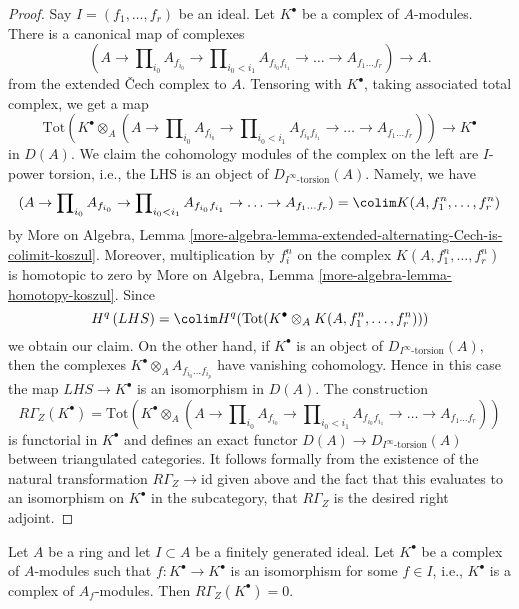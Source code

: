\begin{proof}
Say $I = (f_1, \ldots, f_r)$ be an ideal.
Let $K^\bullet$ be a complex of $A$-modules.
There is a canonical map of complexes
$$
(A \to \prod\nolimits_{i_0} A_{f_{i_0}} \to
\prod\nolimits_{i_0 < i_1} A_{f_{i_0}f_{i_1}} \to
\ldots \to A_{f_1\ldots f_r}) \longrightarrow A.
$$
from the extended {\v C}ech complex to $A$.
Tensoring with $K^\bullet$, taking associated total complex,
we get a map
$$
\text{Tot}\left(
K^\bullet \otimes_A
(A \to \prod\nolimits_{i_0} A_{f_{i_0}} \to
\prod\nolimits_{i_0 < i_1} A_{f_{i_0}f_{i_1}} \to
\ldots \to A_{f_1\ldots f_r})\right)
\longrightarrow
K^\bullet
$$
in $D(A)$. We claim the cohomology modules of the complex on the left are
$I$-power torsion, i.e., the LHS is an object of
$D_{I^\infty\text{-torsion}}(A)$. Namely, we have
$$
(A \to \prod\nolimits_{i_0} A_{f_{i_0}} \to
\prod\nolimits_{i_0 < i_1} A_{f_{i_0}f_{i_1}} \to
\ldots \to A_{f_1\ldots f_r}) = \colim K(A, f_1^n, \ldots, f_r^n)
$$
by More on Algebra, Lemma
\ref{more-algebra-lemma-extended-alternating-Cech-is-colimit-koszul}.
Moreover, multiplication by $f_i^n$ on the complex
$K(A, f_1^n, \ldots, f_r^n)$ is homotopic to zero by
More on Algebra, Lemma \ref{more-algebra-lemma-homotopy-koszul}.
Since
$$
H^q\left( LHS \right) =
\colim H^q(\text{Tot}(K^\bullet \otimes_A K(A, f_1^n, \ldots, f_r^n)))
$$
we obtain our claim. On the other hand, if $K^\bullet$ is an
object of $D_{I^\infty\text{-torsion}}(A)$, then the complexes
$K^\bullet \otimes_A A_{f_{i_0} \ldots f_{i_p}}$ have vanishing
cohomology. Hence in this case the map $LHS \to K^\bullet$
is an isomorphism in $D(A)$. The construction
$$
R\Gamma_Z(K^\bullet) =
\text{Tot}\left(
K^\bullet \otimes_A
(A \to \prod\nolimits_{i_0} A_{f_{i_0}} \to
\prod\nolimits_{i_0 < i_1} A_{f_{i_0}f_{i_1}} \to
\ldots \to A_{f_1\ldots f_r})\right)
$$
is functorial in $K^\bullet$ and defines an exact functor
$D(A) \to D_{I^\infty\text{-torsion}}(A)$ between
triangulated categories. It follows formally from the
existence of the natural transformation $R\Gamma_Z \to \text{id}$
given above and the fact that this evaluates to an isomorphism
on $K^\bullet$ in the subcategory, that $R\Gamma_Z$ is the desired
right adjoint.
\end{proof}

\begin{lemma}
\label{lemma-local-cohomology-vanishes}
Let $A$ be a ring and let $I \subset A$ be a finitely generated ideal.
Let $K^\bullet$ be a complex of $A$-modules such that
$f : K^\bullet \to K^\bullet$ is an isomorphism for some
$f \in I$, i.e., $K^\bullet$ is a complex of $A_f$-modules. Then
$R\Gamma_Z(K^\bullet) = 0$.
\end{lemma}

